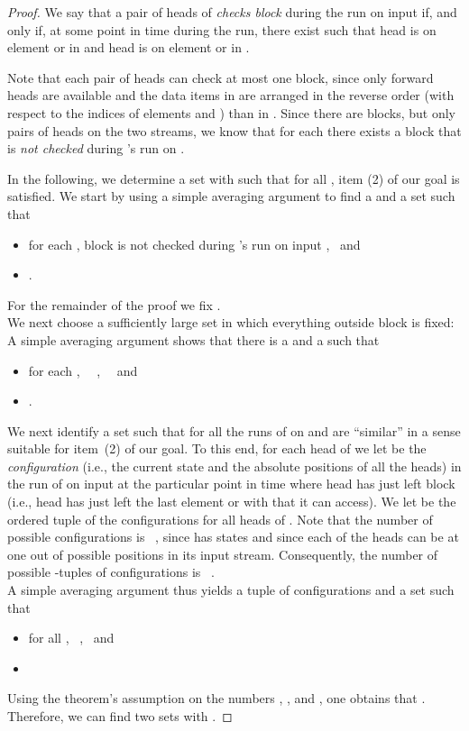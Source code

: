 \documentclass[proceedings]{stacs}
\theoremstyle{plain}\newtheorem{satz}[thm]{Satz}
\theoremstyle{definition}\newtheorem{crucial}[thm]{Crucial Definition}
\newenvironment{mi}{\begin{itemize}}{\end{itemize}}
\begin{document}
\begin{proof}
We say that a pair  of heads of  \emph{checks block } during the run
on input 
if, and only if, at some point in time during the run, there exist
 such that head  is on element
 or  in  and head  is on element
 or  in .

Note that each pair of heads can check at most one block, since only forward heads
are available and the data items in  are arranged in the reverse
order (with respect to the indices  of elements  and ) than in .
Since there are  blocks, but only  pairs  of heads on the
two streams, we know that for each  there exists
a block  that is \emph{not checked} during 's run on .

In the following, we determine a set 
 with  
such that for all , item (2) of our goal is satisfied.
We start by using a simple averaging argument to find a
 and 
a set 
such that \vspace{1ex}
\begin{mi}
 \item 
   for each , block  is not checked during 's run on input
   , \ and  \vspace{1ex}
 \item 
   . \vspace{1ex}
\end{mi}
For the remainder of the proof we fix .
\\
We next choose a sufficiently large set  in which everything outside
block  is fixed:\\
A simple averaging argument shows that there is a
 and a  such that
\vspace{1ex}
\begin{mi}
 \item
   for each , \ \ , \ \ and \vspace{1ex}
 \item 
   .
   \vspace{1ex}
\end{mi}
We next identify a set  such that for all  the runs of
 on  and  are ``similar'' in a sense suitable for
item~(2) of our goal. To this end, for each head  of  we let
 be the \emph{configuration} (i.e., the current state and the absolute
positions of all the heads) in the run of  on input  at the 
particular point in time where head  has just left block  (i.e., head
 has just left the last element  or  with  that it can
access).
We let  be the ordered tuple of the configurations  for all
heads  of .
Note that the number of possible configurations  is 
\ , since  has  states and since each of the
 heads can be at one out of  possible positions in its input stream.
Consequently, the number of possible -tuples  of configurations is 
\ .
\\
A simple averaging argument thus yields a tuple  of configurations and
a set  such that \vspace{1ex}
\begin{mi}
 \item 
   for all , \ , \ and \vspace{1ex}
 \item
    \vspace{1ex}
\end{mi}
Using the theorem's assumption on the 
numbers , , and , one obtains that .
Therefore, we can find two sets  with .


\end{proof}
\end{document}
